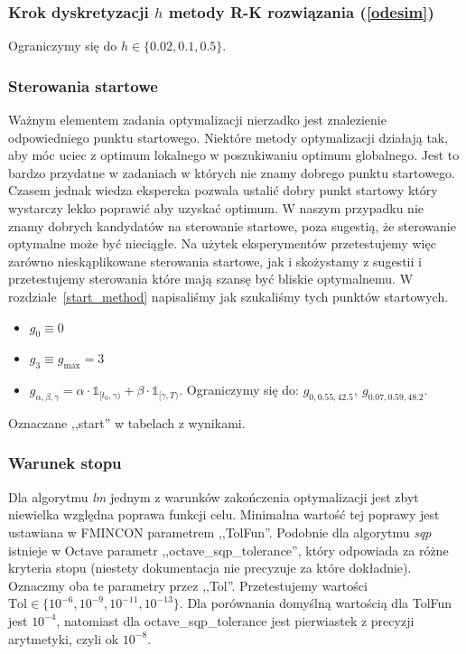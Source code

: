 \documentclass[11pt]{article}
\def\1{\mathds{1}}
\begin{document}
\subsubsection{Krok dyskretyzacji $h$ metody R-K rozwiązania (\ref{odesim})}
Ograniczymy się do $h \in \{0.02, 0.1, 0.5\}$.
\subsubsection{Sterowania startowe}\label{start_control}
Ważnym elementem zadania optymalizacji nierzadko jest znalezienie odpowiedniego punktu startowego. Niektóre metody optymalizacji działają tak, aby móc uciec z optimum lokalnego w poszukiwaniu optimum globalnego. Jest to bardzo przydatne w zadaniach w których nie znamy dobrego punktu startowego. Czasem jednak wiedza ekspercka pozwala ustalić dobry punkt startowy który wystarczy lekko poprawić aby uzyskać optimum. W naszym przypadku nie znamy dobrych kandydatów na sterowanie startowe, poza sugestią, że sterowanie optymalne może być nieciągłe. Na użytek eksperymentów przetestujemy więc zarówno nieskąplikowane sterowania startowe, jak i skożystamy z sugestii i przetestujemy sterowania które mają szansę być bliskie optymalnemu. W rozdziale~\ref{start_method} napisaliśmy jak szukaliśmy tych punktów startowych.
\begin{itemize}
\item $g_0\equiv 0$
\item $g_{3} \equiv g_{\max} = 3$
\item $g_{\alpha,\beta,\gamma} = \alpha \cdot \1_{[t_0, \gamma)} + \beta \cdot \1_{[\gamma, T)}$. Ograniczymy się do: $g_{0,0.55,42.5},\ g_{0.07,0.59,48.2}$.
\end{itemize}
Oznaczane ,,start'' w tabelach z wynikami.

\subsubsection{Warunek stopu}
Dla algorytmu {\it lm\/} jednym z warunków zakończenia optymalizacji jest zbyt niewielka względna poprawa funkcji celu. Minimalna wartość tej poprawy jest ustawiana w FMINCON parametrem ,,TolFun''. Podobnie dla algorytmu {\it sqp\/} istnieje w Octave parametr ,,octave\_sqp\_tolerance'', który odpowiada za różne kryteria stopu (niestety dokumentacja nie precyzuje za które dokładnie). Oznaczmy oba te parametry przez ,,Tol''. Przetestujemy wartości $\text{Tol} \in \{10^{-6}, 10^{-9}, 10^{-11}, 10^{-13}\}$. Dla porównania domyślną wartością dla TolFun jest $10^{-4}$, natomiast dla octave\_sqp\_tolerance jest pierwiastek z precyzji arytmetyki, czyli ok $10^{-8}$.
\end{document}
